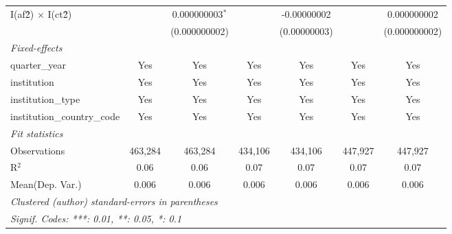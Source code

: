\begin{tabular}{lcccccc}
   I(af\^2) $\times$ I(ct\^2)         &              & 0.000000003$^{*}$ &                & -0.00000002    &               & 0.000000002\\   
                                      &              & (0.000000002)     &                & (0.00000003)   &               & (0.000000002)\\   
   \midrule
   \emph{Fixed-effects}\\
   quarter\_year                      & Yes          & Yes               & Yes            & Yes            & Yes           & Yes\\  
   institution                        & Yes          & Yes               & Yes            & Yes            & Yes           & Yes\\  
   institution\_type                  & Yes          & Yes               & Yes            & Yes            & Yes           & Yes\\  
   institution\_country\_code         & Yes          & Yes               & Yes            & Yes            & Yes           & Yes\\  
   \midrule
   \emph{Fit statistics}\\
   Observations                       & 463,284      & 463,284           & 434,106        & 434,106        & 447,927       & 447,927\\  
   R$^2$                              & 0.06         & 0.06              & 0.07           & 0.07           & 0.07          & 0.07\\  
Mean(Dep. Var.) & 0.006 & 0.006 & 0.006 & 0.006 & 0.006 & 0.006 \\
   \midrule \midrule
   \multicolumn{7}{l}{\emph{Clustered (author) standard-errors in parentheses}}\\
   \multicolumn{7}{l}{\emph{Signif. Codes: ***: 0.01, **: 0.05, *: 0.1}}\\
\end{tabular}
\par\endgroup
